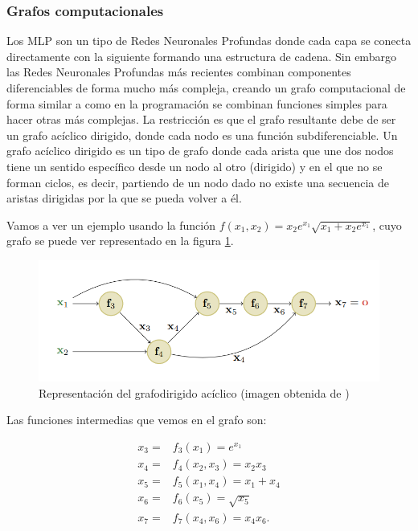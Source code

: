 \subsubsection{Grafos computacionales}

Los MLP son un tipo de Redes Neuronales Profundas donde cada capa se conecta directamente con la siguiente formando una estructura de cadena. Sin embargo las Redes Neuronales Profundas más recientes combinan componentes diferenciables de forma mucho más compleja, creando un grafo computacional de forma similar a como en la programación se combinan funciones simples para hacer otras más complejas. La restricción es que el grafo resultante debe de ser un grafo acíclico dirigido, donde cada nodo es una función subdiferenciable. Un grafo acíclico dirigido es un tipo de grafo donde cada arista que une dos nodos tiene un sentido específico desde un nodo al otro (dirigido) y en el que no se forman ciclos, es decir, partiendo de un nodo dado no existe una secuencia de aristas dirigidas por la que se pueda volver a él.



Vamos a ver un ejemplo usando la función $f(x_1,x_2)=x_2e^{x_1}\sqrt{x_1+x_2e^{x_1}}$, cuyo grafo se puede ver representado en la figura \ref{fig:def.grafo}.


\begin{figure}
    \centering
    \includegraphics[width=1.0\linewidth]{Plantilla_TFG_latex/imagenes/Mat/Definicion/graf.png}
    \caption{Representación del grafodirigido acíclico (imagen obtenida de \cite{murphy2022probabilistic})}
    \label{fig:def.grafo}
\end{figure}


Las funciones intermedias que vemos en el grafo son:

\begin{align*}
x_3= &f_3(x_1)=e^{x_1} \\
x_4 = &f_4(x_2,x_3)=x_2x_3 \\
x_5=&f_5(x_1,x_4)=x_1 + x_4 \\
x_6=&f_6(x_5) = \sqrt{x_5} \\
x_7=&f_7(x_4,x_6)=x_4x_6 .
\end{align*}

